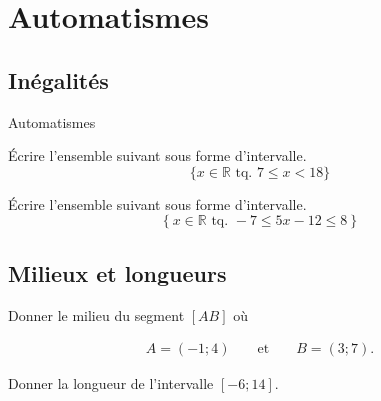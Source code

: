 \documentclass[14pt]{beamer}
\newcommand{\R}{\mathbb{R}}
\begin{document}
\section{Automatismes}

\subsection{Inégalités}

\begin{frame}

\centering \huge
Automatismes

\end{frame}


\begin{frame}{1}
	Écrire l'ensemble suivant sous forme d'intervalle.
		\[ \{ x \in \R \text{ tq. } 7 \leq x < 18 \} \]
	
\end{frame}

\begin{frame}{2}

	Écrire l'ensemble suivant sous forme d'intervalle.
		\[ \left\{ x \in \R \text{ tq. } {-}7 \leq  5x - 12 \leq 8 \right\} \]

\end{frame}

\subsection{Milieux et longueurs}

\begin{frame}{3}

	Donner le milieu du segment $[AB]$ où
	
		\begin{align*}
			A = ({-}1 ; 4) &&  \text{ et } && B = (3 ; 7).
		\end{align*}


\end{frame}


\begin{frame}{4}

	Donner la longueur de l'intervalle $\left[ {-}6 ; 14 \right]$.

\end{frame}
\end{document}
